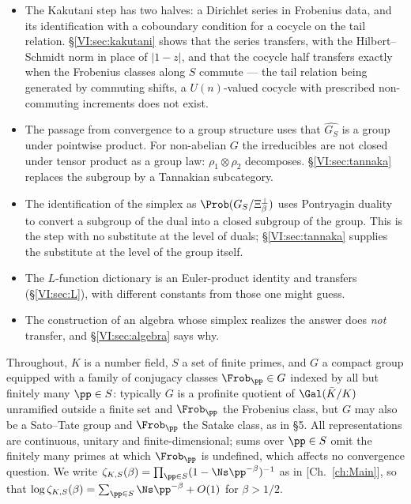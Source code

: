 \begin{itemize}
\item[(i)] The Kakutani step has two halves: a Dirichlet series in Frobenius data, and its
identification with a coboundary condition for a cocycle on the tail relation.
\S\ref{VI:sec:kakutani} shows that the series transfers, with the Hilbert--Schmidt norm in
place of $|1-z|$, and that the cocycle half transfers exactly when the Frobenius classes
along $S$ commute --- the tail relation being generated by commuting shifts, a
$U(n)$-valued cocycle with prescribed non-commuting increments does not exist.
\item[(ii)] The passage from convergence to a group structure uses that $\widehat{G_S}$ is a
group under pointwise product. For non-abelian $G$ the irreducibles are not closed under
tensor product as a group law: $\rho_1\otimes\rho_2$ decomposes. \S\ref{VI:sec:tannaka} replaces
the subgroup by a Tannakian subcategory.
\item[(iii)] The identification of the simplex as $\Prob(G_S/\Xi_\beta^\perp)$ uses
Pontryagin duality to convert a subgroup of the dual into a closed subgroup of the group.
This is the step with no substitute at the level of duals; \S\ref{VI:sec:tannaka} supplies the
substitute at the level of the group itself.
\item[(iv)] The $L$-function dictionary is an Euler-product identity and transfers
(\S\ref{VI:sec:L}), with different constants from those one might guess.
\item[(v)] The construction of an algebra whose simplex realizes the answer does \emph{not}
transfer, and \S\ref{VI:sec:algebra} says why.
\end{itemize}

Throughout, $K$ is a number field, $S$ a set of finite primes, and $G$ a compact group
equipped with a family of conjugacy classes $\Frob_\pp\in G$ indexed by all but finitely
many $\pp\in S$: typically $G$ is a profinite quotient of $\Gal(\bar K/K)$ unramified outside
a finite set and $\Frob_\pp$ the Frobenius class, but $G$ may also be a Sato--Tate group and
$\Frob_\pp$ the Satake class, as in \S5. All representations are continuous, unitary and
finite-dimensional; sums over $\pp\in S$ omit the finitely many primes at which
$\Frob_\pp$ is undefined, which affects no convergence question. We write
$\zeta_{K,S}(\beta)=\prod_{\pp\in S}(1-\Ns\pp^{-\beta})^{-1}$ as in [Ch.~\ref{ch:Main}], so that
$\log\zeta_{K,S}(\beta)=\sum_{\pp\in S}\Ns\pp^{-\beta}+O(1)$ for $\beta>1/2$.

